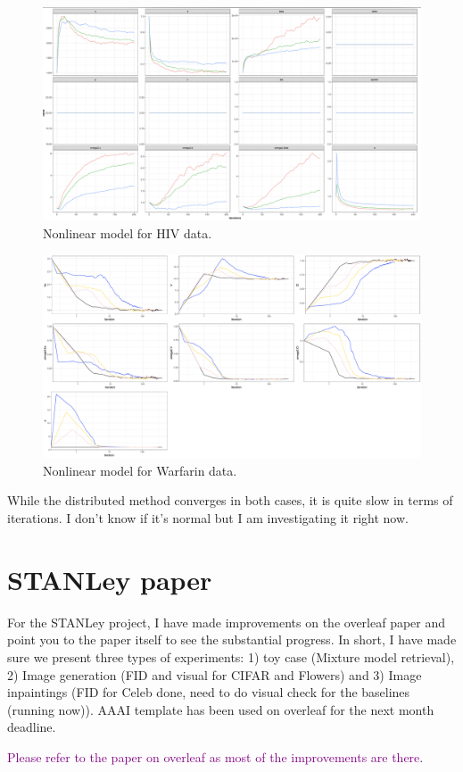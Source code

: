 \documentclass{article}
\begin{document}
\begin{figure}[h]
\centering
\includegraphics[width=\textwidth]{fig/hiv-dist}
\caption{Nonlinear model for HIV data.}
\label{fig:hiv}
\end{figure}


\begin{figure}[h]
\centering
\includegraphics[width=\textwidth]{fig/pk-dist}
\caption{Nonlinear model for Warfarin data.}
\label{fig:PK}
\end{figure}

While the distributed method converges in both cases, it is quite slow in terms of iterations. I don't know if it's normal but I am investigating it right now.

\section{STANLey paper}

For the STANLey project, I have made improvements on the overleaf paper and point you to the paper itself to see the substantial progress.
In short, I have made sure we present three types of experiments: 1) toy case (Mixture model retrieval), 2) Image generation (FID and visual for CIFAR and Flowers) and 3) Image inpaintings (FID for Celeb done, need to do visual check for the baselines (running now)).
AAAI template has been used on overleaf for the next month deadline.

\textcolor{purple}{Please refer to the paper on overleaf as most of the improvements are there}.



\end{document}
